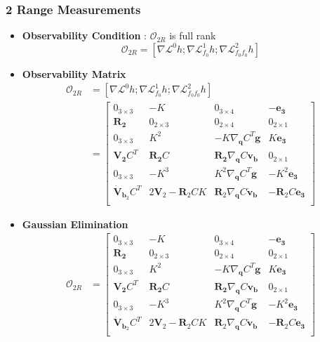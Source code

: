 \documentclass[]{article}
\begin{document}
\subsubsection{2 Range Measurements}
\begin{itemize}
	\item \textbf{Observability Condition} : $\mathcal{O}_{2R}$ is full rank
	\begin{equation*}
		\mathcal{O}_{2R} = [\nabla\mathcal{L}^0h;\nabla\mathcal{L}^1_{f_0}h;\nabla\mathcal{L}^2_{f_0f_0}h]
	\end{equation*}
	\item \textbf{Observability Matrix}
	\begin{align*}
	\mathcal{O}_{2R} &= [\nabla\mathcal{L}^0h;\nabla\mathcal{L}^1_{f_0}h;\nabla\mathcal{L}^2_{f_0f_0}h]\\ 
	&= \begin{bmatrix}
	0_{3\times 3}& -K& 0_{3\times 4}& -\bm{e_3}\\
	\bm{R_2} & 0_{2\times 3} & 0_{2\times 4} & 0_{2\times 1}\\
	0_{3\times 3}& K^2& -K\nabla_{\bm{q}} C^T\bm{g}& K\bm{e_3}\\
	\bm{V_2} C^T & \bm{R_2}C & \bm{R_2}\nabla_{\bm{q}} C\bm{v_b} & 0_{2\times 1}\\
	0_{3\times 3}& -K^3& K^2\nabla_{\bm{q}} C^T\bm{g}& -K^2\bm{e_3}\\
	\bm{\dot{V}}_{\bm{b}_2} C^T & 2\bm{V}_2 - \bm{R}_2CK & \bm{R}_2\nabla_{\bm{q}} C\bm{\dot{v}_b} & -\bm{R}_2C\bm{e_3}\\
	\end{bmatrix}
	\end{align*}
	\item  \textbf{Gaussian Elimination}
	\begin{align*}
	\mathcal{O}_{2R} &= \begin{bmatrix}
	0_{3\times 3}& -K& 0_{3\times 4}& -\bm{e_3}\\
	\bm{R_2} & 0_{2\times 3} & 0_{2\times 4} & 0_{2\times 1}\\
	0_{3\times 3}& K^2& -K\nabla_{\bm{q}} C^T\bm{g}& K\bm{e_3}\\
	\bm{V_2} C^T & \bm{R_2}C & \bm{R_2}\nabla_{\bm{q}} C\bm{v_b} & 0_{2\times 1}\\
	0_{3\times 3}& -K^3& K^2\nabla_{\bm{q}} C^T\bm{g}& -K^2\bm{e_3}\\
	\bm{\dot{V}}_{\bm{b}_2} C^T & 2\bm{V}_2 - \bm{R}_2CK & \bm{R}_2\nabla_{\bm{q}} C\bm{\dot{v}_b} & -\bm{R}_2C\bm{e_3}\\
	\end{bmatrix}\\

\end{align*}
\end{itemize}
\end{document}
